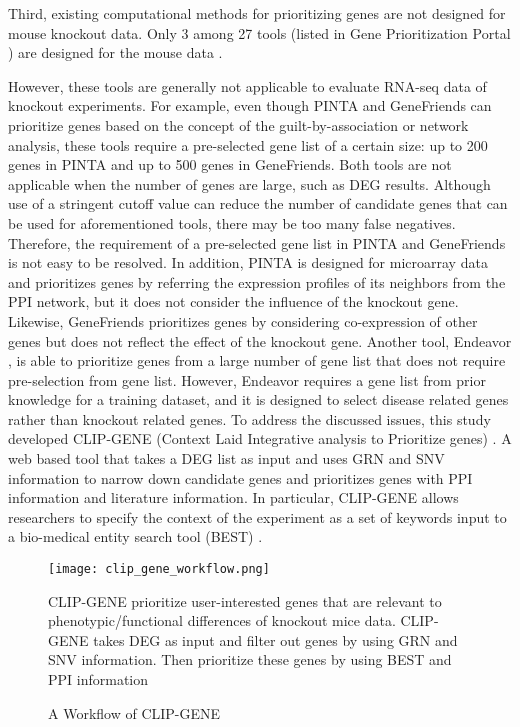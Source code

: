 \documentclass[oneside,phd]{snuthesis}
\begin{document}
Third, existing computational methods for prioritizing genes are not designed for mouse knockout data. 
Only 3 among 27 tools (listed in Gene Prioritization Portal \citep{tranchevent2010guide}) are designed for the mouse data \citep{van2012genefriends, tranchevent2008ndeavour,nitsch2011pinta}.

However, these tools are generally not applicable to evaluate RNA-seq data of knockout experiments. 
For example, even though PINTA \citep{nitsch2011pinta} and GeneFriends \citep{van2012genefriends} can prioritize genes based on the concept of the guilt-by-association or network analysis, these tools require a pre-selected gene list of a certain size: up to 200 genes in PINTA and up to 500 genes in GeneFriends.
Both tools are not applicable when the number of genes are large, such as DEG results. 
Although use of a stringent cutoff value can reduce the number of candidate genes that can be used for aforementioned tools, there may be too many false negatives.
Therefore, the requirement of a pre-selected gene list in PINTA and GeneFriends is not easy to be resolved.
In addition, PINTA is designed for microarray data and prioritizes genes by referring the expression profiles of its neighbors from the PPI network, but it does not consider the influence of the knockout gene. 
Likewise, GeneFriends prioritizes genes by considering co-expression of other
genes but does not reflect the effect of the knockout gene.
Another tool, Endeavor \citep{tranchevent2008ndeavour}, is able to prioritize genes from a large number of gene list that does not require pre-selection from gene list. 
However, Endeavor requires a gene list from prior knowledge for a training dataset, and it is designed to select disease related genes rather than knockout related genes. 
To address the discussed issues, this study developed CLIP-GENE (Context Laid Integrative analysis to Prioritize genes) \citep{hur2016clip}. 
A web based tool that takes a DEG list as input and uses GRN and SNV information to narrow down candidate genes and prioritizes genes with PPI information and literature information. 
In particular, CLIP-GENE allows researchers to specify the context of the experiment as a set of keywords input to a bio-medical entity search tool (BEST) \citep{lee2016best}.

\begin{figure*}
\begin{center}
\texttt{[image: clip\_gene\_workflow.png]}
\end{center}
\caption{A Workflow of CLIP-GENE \citep{hur2016clip}}
\scriptsize{
CLIP-GENE prioritize user-interested genes that are relevant to phenotypic/functional differences of knockout mice data. CLIP-GENE takes DEG as input and filter out genes by using GRN and SNV information. Then prioritize these genes by using BEST and PPI information}
\label{fig:clip_gene_work_flow}
\end{figure*}
\end{document}
